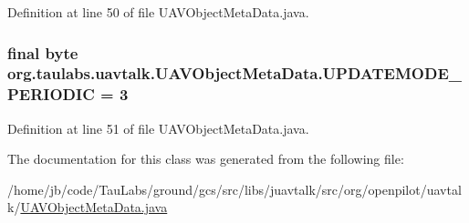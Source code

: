 \-Definition at line 50 of file \-U\-A\-V\-Object\-Meta\-Data.\-java.

\hypertarget{classorg_1_1taulabs_1_1uavtalk_1_1_u_a_v_object_meta_data_a0de23ed97539abcf565c1fdc46d47f80}{
\subsubsection[{\-U\-P\-D\-A\-T\-E\-M\-O\-D\-E\-\_\-\-P\-E\-R\-I\-O\-D\-I\-C}]{\setlength{\rightskip}{0pt plus 5cm}final byte {\bf org.\-taulabs.\-uavtalk.\-U\-A\-V\-Object\-Meta\-Data.\-U\-P\-D\-A\-T\-E\-M\-O\-D\-E\-\_\-\-P\-E\-R\-I\-O\-D\-I\-C} = 3}}\label{classorg_1_1taulabs_1_1uavtalk_1_1_u_a_v_object_meta_data_a0de23ed97539abcf565c1fdc46d47f80}


\-Definition at line 51 of file \-U\-A\-V\-Object\-Meta\-Data.\-java.



\-The documentation for this class was generated from the following file\-:\begin{DoxyCompactItemize}
\item 
/home/jb/code/\-Tau\-Labs/ground/gcs/src/libs/juavtalk/src/org/openpilot/uavtalk/\hyperlink{_u_a_v_object_meta_data_8java}{\-U\-A\-V\-Object\-Meta\-Data.\-java}\end{DoxyCompactItemize}
